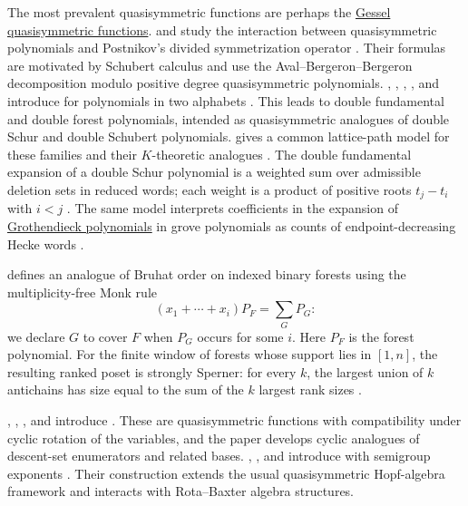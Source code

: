 The most prevalent quasisymmetric functions are perhaps the \hyperref[gessel]{Gessel quasisymmetric functions}.
 and  study the interaction between
quasisymmetric polynomials and Postnikov's divided symmetrization operator
\cite{NadeauTewari2021Divided}.  Their formulas are motivated by Schubert
calculus and use the Aval--Bergeron--Bergeron decomposition modulo positive
degree quasisymmetric polynomials.
, , ,
, and  introduce
\label{equivariantQuasisymmetry} for
polynomials in two alphabets
\cite{BergeronGagnonNadeauSpinkTewari2025x}.  This leads to double
fundamental and double forest polynomials, intended as quasisymmetric
analogues of double Schur and double Schubert polynomials.
 gives a common lattice-path model for these families and
their $K$-theoretic analogues \cite{Lee2026ForestPaths}.
The double fundamental expansion of a double Schur polynomial is a weighted
sum over admissible deletion sets in reduced words; each weight is a product
of positive roots $t_j-t_i$ with $i<j$
\cite[Cor.~35]{Lee2026ForestPaths}. The same model interprets coefficients
in the expansion of \hyperref[grothendieck]{Grothendieck polynomials} in
grove polynomials as counts of endpoint-decreasing Hecke words
\cite[Thm.~46]{Lee2026ForestPaths}.

 defines an analogue of Bruhat order on indexed binary
forests using the multiplicity-free Monk rule
\[
 (x_1+\dotsb+x_i)P_F=\sum_G P_G:
\]
we declare $G$ to cover $F$ when $P_G$ occurs for some $i$.
Here $P_F$ is the forest polynomial. For the finite window of forests
whose support lies in $[1,n]$, the resulting ranked poset is strongly
Sperner: for every $k$, the largest union of $k$ antichains has size equal
to the sum of the $k$ largest rank sizes
\cite[Thm.~3.5 and Cor.~3.7]{Bansal2026x}.

, , , and
 introduce
\label{cyclicQuasisymmetricFunction}
\cite{AdinGesselReinerRoichman2021}.  These are quasisymmetric functions
with compatibility under cyclic rotation of the variables, and the paper
develops cyclic analogues of descent-set enumerators and related bases.
, , and  introduce
\label{multiQuasisymmetricFunction}
with semigroup exponents
\cite{GaoGuoPeng2024x}.  Their construction extends the usual
quasisymmetric Hopf-algebra framework and interacts with Rota--Baxter algebra
structures.

